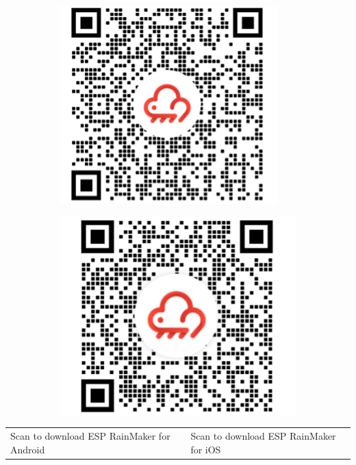 \documentclass[a4paper,12pt,openany]{book}
\begin{document}
\begin{figure}[h!]
    \Centering
    \begin{subfigure}{0.45\textwidth}
        \RaggedLeft
        \includegraphics[height=0.7\textwidth]{D3Z/Android} 
    \end{subfigure}\hspace{40pt}
    \begin{subfigure}{0.45\textwidth}
        \RaggedRight
        \includegraphics[height=0.7\textwidth]{D3Z/iOS}
    \end{subfigure}
\end{figure}

\begin{tabular}{>{\Centering}m{20em} >{\Centering}m{18em}}
\small{Scan to download ESP RainMaker for Android}&\small{Scan to download ESP RainMaker for iOS}
\end{tabular}
\end{document}

